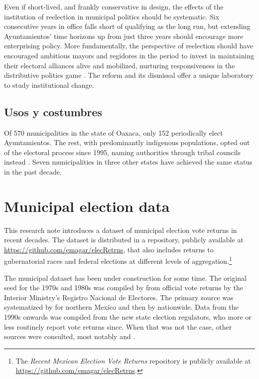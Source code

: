 \documentclass[letter,12pt]{article}
\begin{document}
Even if short-lived, and frankly conservative in design, the effects of the institution of reelection in municipal politics should be systematic. Six consecutive years in office falls short of qualifying as the long run, but extending Ayuntamientos' time horizons up from just three years should encourage more enterprising policy. More fundamentally, the perspective of reelection should have encouraged ambitious mayors and regidores in the period to invest in maintaining their electoral alliances alive and mobilized, nurturing responsiveness in the distributive politics game \citep{cain.etal.1987, cox.mccubbins.1986, motolinia-reel-pork2021}. The reform and its dismissal offer a unique laboratory to study institutional change.

\subsection{Usos y costumbres}
Of 570 municipalities in the state of Oaxaca, only 152 periodically elect Ayuntamientos. The rest, with predominantly indigenous populations, opted out of the electoral process since 1995, naming authorities through tribal councils instead \citep[known as \emph{usos y costumbres} institutions, see][]{elizarraras.2002,eisenstadt.rios.uyc.2014}. Seven municipalities in three other states have achieved the same status in the past decade. 

\section{Municipal election data}
This research note introduces a dataset of municipal election vote returns in recent decades. The dataset is distributed in a repository, publicly available at \url{https://github.com/emagar/elecRetrns}, that also includes returns to gubernatorial races and federal elections at different levels of aggregation.\footnote{The \emph{Recent Mexican Election Vote Returns} repository is publicly available at \url{https://github.com/emagar/elecRetrns}.} 

The municipal dataset has been under construction for some time. The original seed for the 1970s and 1980s was compiled by \citet{molinar.1991a} from official vote returns by the Interior Ministry's Registro Nacional de Electores. The primary source was systematized by \citet{magar.1994} for northern Mexico and then by \citet{varela.2004} nationwide. Data from the 1990s onwards was compiled from the new state election regulators, who more or less routinely report vote returns since. When that was not the case, other sources were consulted, most notably \citet{revista.voz.y.voto} and \citet{cede.uam.izt}.
\end{document}
